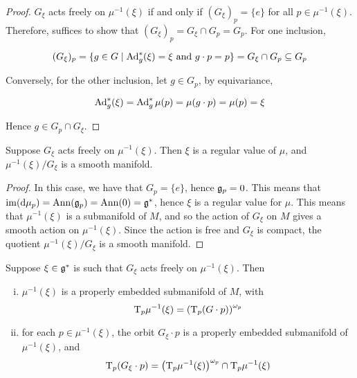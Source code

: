 \documentclass{article}
\begin{document}
\begin{proof}
    \(G_\xi\) acts freely on \(\mu^{-1}(\xi)\) if and only if \((G_\xi)_p = \{e\}\) for all \(p \in \mu^{-1}(\xi)\). Therefore, suffices to show that \((G_\xi)_p = G_\xi \cap G_p = G_p\). For one inclusion,

    \[(G_\xi)_p = \{g \in G \mid \operatorname{Ad}_g^*(\xi) = \xi \text{ and } g \cdot p = p\} = G_\xi \cap G_p \subseteq G_p\]

    Conversely, for the other inclusion, let \(g \in G_p\), by equivariance,

    \[\operatorname{Ad}_g^*(\xi) = \operatorname{Ad}_g^*\mu(p) = \mu(g \cdot p) = \mu(p) = \xi\]

    Hence \(g \in G_p \cap G_\xi\).
\end{proof}

\begin{lemma}
    Suppose \(G_\xi\) acts freely on \(\mu^{-1}(\xi)\). Then \(\xi\) is a regular value of \(\mu\), and \(\mu^{-1}(\xi)/G_\xi\) is a smooth manifold.
\end{lemma}

\begin{proof}
    In this case, we have that \(G_p = \{e\}\), hence \(\mathfrak{g}_p = 0\). This means that \(\operatorname{im}(\dd\mu_p) = \operatorname{Ann}(\mathfrak{g}_p) = \operatorname{Ann}(0) = \mathfrak{g}^*\), hence \(\xi\) is a regular value for \(\mu\). This means that \(\mu^{-1}(\xi)\) is a submanifold of \(M\), and so the action of \(G_\xi\) on \(M\) gives a smooth action on \(\mu^{-1}(\xi)\). Since the action is free and \(G_\xi\) is compact, the quotient \(\mu^{-1}(\xi)/G_\xi\) is a smooth manifold.
\end{proof}

\begin{proposition}
    Suppose \(\xi \in \mathfrak{g}^*\) is such that \(G_\xi\) acts freely on \(\mu^{-1}(\xi)\). Then

    \begin{enumerate}[(i)]
        \item \(\mu^{-1}(\xi)\) is a properly embedded submanifold of \(M\), with
        \[\mathrm{T}_p\mu^{-1}(\xi) = \left(\mathrm{T}_p(G \cdot p)\right)^{\omega_p}\]
        \item for each \(p \in \mu^{-1}(\xi)\), the orbit \(G_\xi \cdot p\) is a properly embedded submanifold of \(\mu^{-1}(\xi)\), and
        \[\mathrm{T}_p(G_\xi \cdot p) = \left(\mathrm{T}_p\mu^{-1}(\xi)\right)^{\omega_p} \cap \mathrm{T}_p\mu^{-1}(\xi)\]
    \end{enumerate}
\end{proposition}
\end{document}
